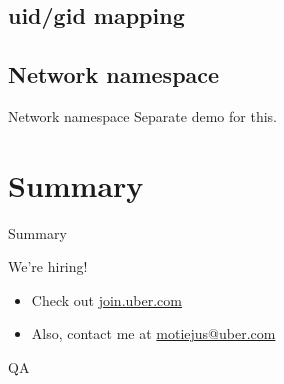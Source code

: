 \documentclass[14pt]{beamer}
\begin{document}
\subsection{uid/gid mapping}

\subsection{Network namespace}
\begin{frame}{Network namespace}
    Separate demo for this.
\end{frame}

\section{Summary}
\begin{frame}{Summary}
\end{frame}

\begin{frame}{We're hiring!}
    \begin{itemize}
        \item Check out \href{http://join.uber.com}{join.uber.com}
        \item Also, contact me at \href{mailto:motiejus@uber.com}{motiejus@uber.com}
    \end{itemize}
\end{frame}

\begin{frame}{QA}
\end{frame}
\end{document}
